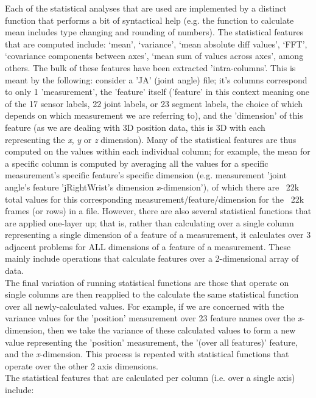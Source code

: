 \documentclass[12pt,twoside]{report}
\begin{document}
\quad Each of the statistical analyses that are used are implemented by a distinct function that performs a bit of syntactical help (e.g. the function to calculate mean includes type changing and rounding of numbers). The statistical features that are computed include: ‘mean’, ‘variance’, ‘mean absolute diff values’, ‘FFT’, ‘covariance components between axes’, ‘mean sum of values across axes’, among others. The bulk of these features have been extracted 'intra-columns'. This is meant by the following: consider a 'JA' (joint angle) file; it's columns correspond to only 1 'measurement', the 'feature' itself ('feature' in this context meaning one of the 17 sensor labels, 22 joint labels, or 23 segment labels, the choice of which depends on which measurement we are referring to), and the 'dimension' of this feature (as we are dealing with 3D position data, this is 3D with each representing the \textit{x}, \textit{y} or \textit{z} dimension). Many of the statistical features are thus computed on the values within each individual column; for example, the mean for a specific column is computed by averaging all the values for a specific measurement's specific feature's specific dimension (e.g. measurement 'joint angle's feature 'jRightWrist's dimension \textit{x}-dimension'), of which there are ~22k total values for this corresponding measurement/feature/dimension for the ~22k frames (or rows) in a file. However, there are also several statistical functions that are applied one-layer up; that is, rather than calculating over a single column representing a single dimension of a feature of a measurement, it calculates over 3 adjacent problems for ALL dimensions of a feature of a measurement. These mainly include operations that calculate features over a 2-dimensional array of data.\\

\quad The final variation of running statistical functions are those that operate on single columns are then reapplied to the calculate the same statistical function over all newly-calculated values. For example, if we are concerned with the variance values for the 'position' measurement over 23 feature names over the \textit{x}-dimension, then we take the variance of these calculated values to form a new value representing the 'position' measurement, the '(over all features)' feature, and the \textit{x}-dimension. This process is repeated with statistical functions that operate over the other 2 axis dimensions.\\

\quad The statistical features that are calculated per column (i.e. over a single axis) include:
\end{document}

